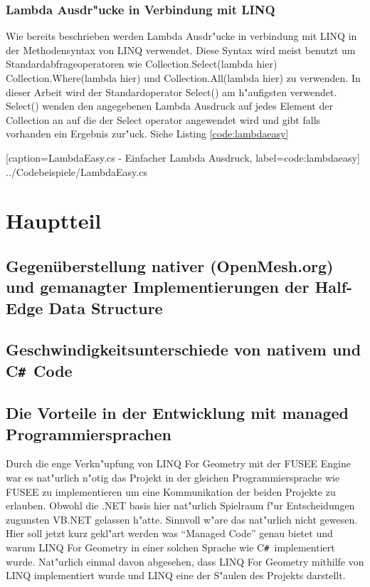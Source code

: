 \documentclass[pagesize, paper=a4, fontsize=12pt,titlepage=true, headings=small, headnosepline, abstractoff, liststotoc, nochapterprefix, plainheadsepline]{scrreprt}
\newcommand{\CSS}{C\texttt{\# }}
\newcommand{\LFGS}{LINQ For Geometry }
\begin{document}
		\subsection {Lambda Ausdr"ucke in Verbindung mit LINQ}
Wie bereits beschrieben werden Lambda Ausdr"ucke  in verbindung mit LINQ in der Methodensyntax von LINQ verwendet. Diese Syntax wird meist benutzt um Standardabfrageoperatoren wie Collection.Select(lambda hier) Collection.Where(lambda hier) und Collection.All(lambda hier) zu verwenden. In dieser Arbeit wird der Standardoperator Select() am h"aufigsten verwendet. Select() wenden den angegebenen Lambda Ausdruck auf jedes Element der Collection an auf die der Select operator angewendet wird und gibt falls vorhanden ein Ergebnis zur"uck. Siehe Listing \ref{code:lambdaeasy}

			[caption={LambdaEasy.cs - Einfacher Lambda Ausdruck}, label=code:lambdaeasy]
			{../Codebeispiele/LambdaEasy.cs}




\chapter {Hauptteil}
	\section {Gegenüberstellung nativer (OpenMesh.org) und gemanagter Implementierungen der Half-Edge Data Structure}
	\section {Geschwindigkeitsunterschiede von nativem und \CSS Code}
	\section {Die Vorteile in der Entwicklung mit managed Programmiersprachen}\label{sec:VorteileManaged}
Durch die enge Verkn"upfung von \LFGS mit der FUSEE Engine war es nat"urlich n"otig das Projekt in der gleichen Programmiersprache wie FUSEE zu implementieren um eine Kommunikation der beiden Projekte zu erlauben. Obwohl die .NET basis hier nat"urlich Spielraum f"ur Entscheidungen zugunsten VB.NET gelassen h"atte. Sinnvoll w"are das nat"urlich nicht gewesen. Hier soll jetzt kurz gekl"art werden was "`Managed Code"' genau bietet und warum \LFGS in einer solchen Sprache wie \CSS implementiert wurde. Nat"urlich einmal davon abgesehen, dass \LFGS mithilfe von LINQ implementiert wurde und LINQ eine der S"aulen des Projekts darstellt.
\end{document}
